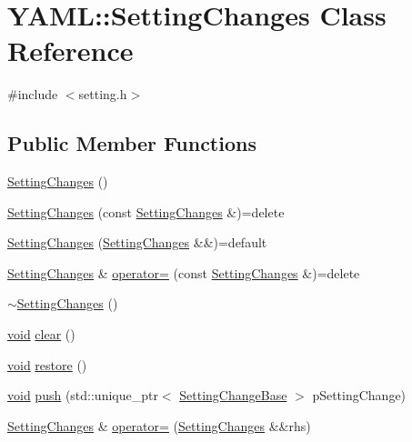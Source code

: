 \hypertarget{class_y_a_m_l_1_1_setting_changes}{}\section{Y\+A\+ML\+::Setting\+Changes Class Reference}
\label{class_y_a_m_l_1_1_setting_changes}


{\ttfamily \#include $<$setting.\+h$>$}

\subsection*{Public Member Functions}
\begin{DoxyCompactItemize}
\item 
\mbox{\hyperlink{class_y_a_m_l_1_1_setting_changes_a873fb8088408ec026587855426c4f135}{Setting\+Changes}} ()
\item 
\mbox{\hyperlink{class_y_a_m_l_1_1_setting_changes_a23d702f3f42ac5419aa1897c32f181ba}{Setting\+Changes}} (const \mbox{\hyperlink{class_y_a_m_l_1_1_setting_changes}{Setting\+Changes}} \&)=delete
\item 
\mbox{\hyperlink{class_y_a_m_l_1_1_setting_changes_a4b14a9e5aa45dbfb80325d4877f17515}{Setting\+Changes}} (\mbox{\hyperlink{class_y_a_m_l_1_1_setting_changes}{Setting\+Changes}} \&\&)=default
\item 
\mbox{\hyperlink{class_y_a_m_l_1_1_setting_changes}{Setting\+Changes}} \& \mbox{\hyperlink{class_y_a_m_l_1_1_setting_changes_a33c013b522ef1bc257a5d62cea74abbe}{operator=}} (const \mbox{\hyperlink{class_y_a_m_l_1_1_setting_changes}{Setting\+Changes}} \&)=delete
\item 
\mbox{\hyperlink{class_y_a_m_l_1_1_setting_changes_a2d528d31b4a26a48cfa42000dc250f49}{$\sim$\+Setting\+Changes}} ()
\item 
\mbox{\hyperlink{glad_8h_a950fc91edb4504f62f1c577bf4727c29}{void}} \mbox{\hyperlink{class_y_a_m_l_1_1_setting_changes_a1625c10bce7e3cfb6f46e002c0f70db5}{clear}} ()
\item 
\mbox{\hyperlink{glad_8h_a950fc91edb4504f62f1c577bf4727c29}{void}} \mbox{\hyperlink{class_y_a_m_l_1_1_setting_changes_acf528bbc50a20a67b9b951cc82b42462}{restore}} ()
\item 
\mbox{\hyperlink{glad_8h_a950fc91edb4504f62f1c577bf4727c29}{void}} \mbox{\hyperlink{class_y_a_m_l_1_1_setting_changes_a20d6ae434d53a514067b726db231a772}{push}} (std\+::unique\+\_\+ptr$<$ \mbox{\hyperlink{class_y_a_m_l_1_1_setting_change_base}{Setting\+Change\+Base}} $>$ p\+Setting\+Change)
\item 
\mbox{\hyperlink{class_y_a_m_l_1_1_setting_changes}{Setting\+Changes}} \& \mbox{\hyperlink{class_y_a_m_l_1_1_setting_changes_a1f771f8ca4d357626d57c8f41fa9e075}{operator=}} (\mbox{\hyperlink{class_y_a_m_l_1_1_setting_changes}{Setting\+Changes}} \&\&rhs)
\end{DoxyCompactItemize}


